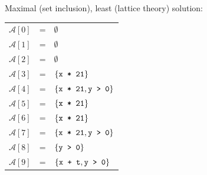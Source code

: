 \documentclass[a4paper]{article}
\begin{document}
\begin{enumerate}
  Maximal (set inclusion), least (lattice theory) solution:

  \begin{tabular}{lll}
    $\mathcal{A}[0]$ & = & $\emptyset$                     \\
    $\mathcal{A}[1]$ & = & $\emptyset$                     \\
    $\mathcal{A}[2]$ & = & $\emptyset$                     \\
    $\mathcal{A}[3]$ & = & $\{\texttt{x * 21}\}$               \\
    $\mathcal{A}[4]$ & = & $\{\texttt{x * 21}, \texttt{y > 0}\}$   \\
    $\mathcal{A}[5]$ & = & $\{\texttt{x * 21}\}$               \\
    $\mathcal{A}[6]$ & = & $\{\texttt{x * 21}\}$               \\
    $\mathcal{A}[7]$ & = & $\{\texttt{x * 21}, \texttt{y > 0}\}$   \\
    $\mathcal{A}[8]$ & = & $\{\texttt{y > 0}\}$                \\   
    $\mathcal{A}[9]$ & = & $\{\texttt{x + t}, \texttt{y > 0}\}$    \\
  \end{tabular}



\end{enumerate}
\end{document}
